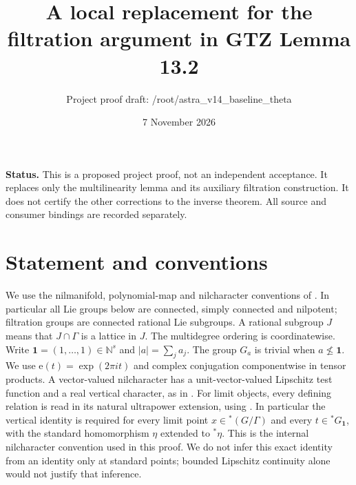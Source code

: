 \documentclass[11pt]{article}
\title{A local replacement for the filtration argument in GTZ Lemma 13.2}
\author{Project proof draft: /root/astra\_v14\_baseline\_theta}
\date{7 November 2026}
\newcommand{\N}{\mathbb N}
\newcommand{\one}{\mathbf 1}
\newcommand{\ee}{\mathrm e}
\begin{document}
\maketitle

\noindent\textbf{Status.} This is a proposed project proof, not an independent
acceptance. It replaces only the multilinearity lemma and its auxiliary
filtration construction. It does not certify the other corrections to the
inverse theorem. All source and consumer bindings are recorded separately.

\section{Statement and conventions}

We use the nilmanifold, polynomial-map and nilcharacter conventions of
\cite[Sections 3, 4 and 6]{GTZ}. In particular all Lie groups below are connected,
simply connected and nilpotent; filtration groups are connected rational Lie
subgroups. A rational subgroup $J$ means that $J\cap\Gamma$ is a lattice in $J$.
The multidegree ordering is coordinatewise. Write
$\one=(1,\ldots,1)\in\N^s$ and $|a|=\sum_j a_j$.
The group $G_a$ is trivial when $a\not\leq\one$.
We use $\ee(t)=\exp(2\pi i t)$ and complex conjugation componentwise in tensor
products. A vector-valued nilcharacter has a unit-vector-valued Lipschitz
test function and a real vertical character, as in \cite[Definition 6.1]{GTZ}.
For limit objects, every defining relation is read in its natural ultrapower
extension, using \cite[Appendix A, Definition A.2 and the following discussion,
and Definition A.3, pp.~1324--1325]{GTZ}. In particular the vertical identity
is required for every limit point $x\in{}^*(G/\Gamma)$ and every
$t\in{}^*G_{\one}$, with the standard homomorphism $\eta$ extended to
$^*\eta$. This is the internal nilcharacter convention used in this proof.
We do not infer this exact identity from an identity only at standard points;
bounded Lipschitz continuity alone would not justify that inference.
\end{document}
